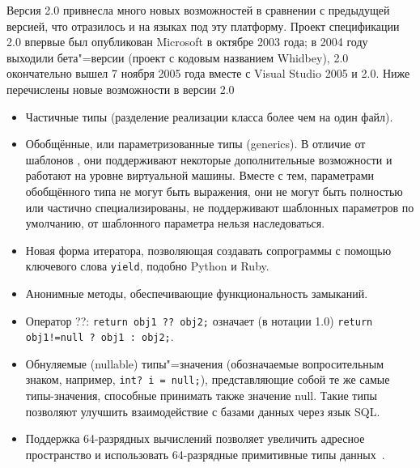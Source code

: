 Версия \dotnet{} 2.0 привнесла много новых возможностей в сравнении с предыдущей версией, что отразилось и на языках под эту платформу.
Проект спецификации \csharp{} 2.0 впервые был опубликован Microsoft в октябре 2003 года; в 2004 году выходили бета"=версии (проект с кодовым названием Whidbey), \csharp{} 2.0 окончательно вышел 7 ноября 2005 года вместе с Visual Studio 2005 и \dotnet{} 2.0. 
Ниже перечислены новые возможности в версии 2.0
\begin{itemize}
  \item Частичные типы (разделение реализации класса более чем на один файл).

  \item Обобщённые, или параметризованные типы (generics). 
  В отличие от шаблонов \cpp{}, они поддерживают некоторые дополнительные возможности и работают на уровне виртуальной машины.
  Вместе с тем, параметрами обобщённого типа не могут быть выражения, они не могут быть полностью или частично специализированы, не поддерживают шаблонных параметров по умолчанию, от шаблонного параметра нельзя наследоваться.

  \item Новая форма итератора, позволяющая создавать сопрограммы с помощью ключевого слова \lstinline[style=csharpinlinestyle]!yield!, подобно Python и Ruby.
  
  \item Анонимные методы, обеспечивающие функциональность замыканий.

  \item Оператор ??: \lstinline!return obj1 ?? obj2;! означает (в нотации \csharp{} 1.0) \lstinline[style=csharpinlinestyle]/return obj1!=null ? obj1 : obj2;/.

  \item Обнуляемые (nullable) типы"=значения (обозначаемые вопросительным знаком, например, \lstinline[style=csharpinlinestyle]!int? i = null;!), представляющие собой те же самые типы-значения, способные принимать также значение null. 
  Такие типы позволяют улучшить взаимодействие с базами данных через язык SQL.

  \item Поддержка 64-разрядных вычислений позволяет увеличить адресное пространство и использовать 64-разрядные примитивные типы данных~\cite{csharp_wiki_2013_ru}.
\end{itemize}


